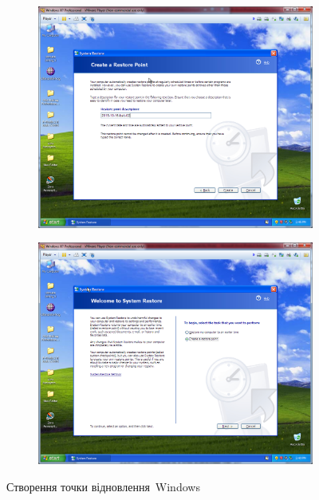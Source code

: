 \documentclass[
	a4paper,
	oneside,
	DIV = 12,
	fontsize = 13pt,
	headings = normal,
]{scrartcl}
\begin{document}
			\begin{figure}[!htbp]
				\centering
				\begin{subfigure}{0.5\columnwidth}
					\centering
					\includegraphics[height = 8\baselineskip]{./assets/y03s01-pcdiag-lab-04-p08.png}
					\caption{}
					\label{subfig:05-01-windows-sysrestore-creation-start}
				\end{subfigure}%
				\begin{subfigure}{0.5\columnwidth}
					\centering
					\includegraphics[height = 8\baselineskip]{./assets/y03s01-pcdiag-lab-04-p09.png}
					\caption{}
					\label{subfig:05-01-windows-sysrestore-creation-finish}
				\end{subfigure}%
				\caption{Створення точки відновлення~\textenglish{Windows}}
				\label{fig:05-windows-sysrestore-creation}
			\end{figure}
\end{document}
